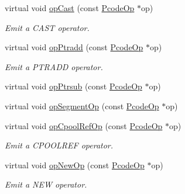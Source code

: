 \begin{DoxyCompactItemize}
virtual void \mbox{\hyperlink{class_print_c_a7f9b5d8494d9596574bf1eb5f0fb805f}{op\+Cast}} (const \mbox{\hyperlink{class_pcode_op}{Pcode\+Op}} $\ast$op)
\begin{DoxyCompactList}\small\item\em Emit a C\+A\+ST operator. \end{DoxyCompactList}\item 
virtual void \mbox{\hyperlink{class_print_c_a874943e6cf1f05650dca821959252182}{op\+Ptradd}} (const \mbox{\hyperlink{class_pcode_op}{Pcode\+Op}} $\ast$op)
\begin{DoxyCompactList}\small\item\em Emit a P\+T\+R\+A\+DD operator. \end{DoxyCompactList}\item 
virtual void \mbox{\hyperlink{class_print_c_ab1393c30ad5d4f636caff4c0d032b5cd}{op\+Ptrsub}} (const \mbox{\hyperlink{class_pcode_op}{Pcode\+Op}} $\ast$op)
\item 
virtual void \mbox{\hyperlink{class_print_c_a3a890f58a0ef3db04c0920e4351c5227}{op\+Segment\+Op}} (const \mbox{\hyperlink{class_pcode_op}{Pcode\+Op}} $\ast$op)
\item 
virtual void \mbox{\hyperlink{class_print_c_a2f6a00b628fe40bde90f5e82bf503979}{op\+Cpool\+Ref\+Op}} (const \mbox{\hyperlink{class_pcode_op}{Pcode\+Op}} $\ast$op)
\begin{DoxyCompactList}\small\item\em Emit a C\+P\+O\+O\+L\+R\+EF operator. \end{DoxyCompactList}\item 
virtual void \mbox{\hyperlink{class_print_c_a2eaf61f8c432d655a8ade65c5dd65983}{op\+New\+Op}} (const \mbox{\hyperlink{class_pcode_op}{Pcode\+Op}} $\ast$op)
\begin{DoxyCompactList}\small\item\em Emit a N\+EW operator. \end{DoxyCompactList}\end{DoxyCompactItemize}
